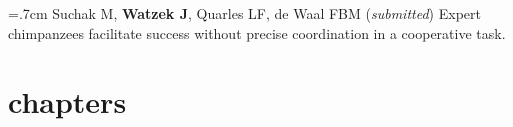 \documentclass[]{friggeri-cv}
\begin{document}
\hangindent=.7cm Suchak M, \textbf{Watzek J}, Quarles LF, de Waal FBM (\emph{submitted}) Expert chimpanzees facilitate success without precise coordination in a cooperative task. \\[-.1cm] 













\section{chapters}
\end{document}
